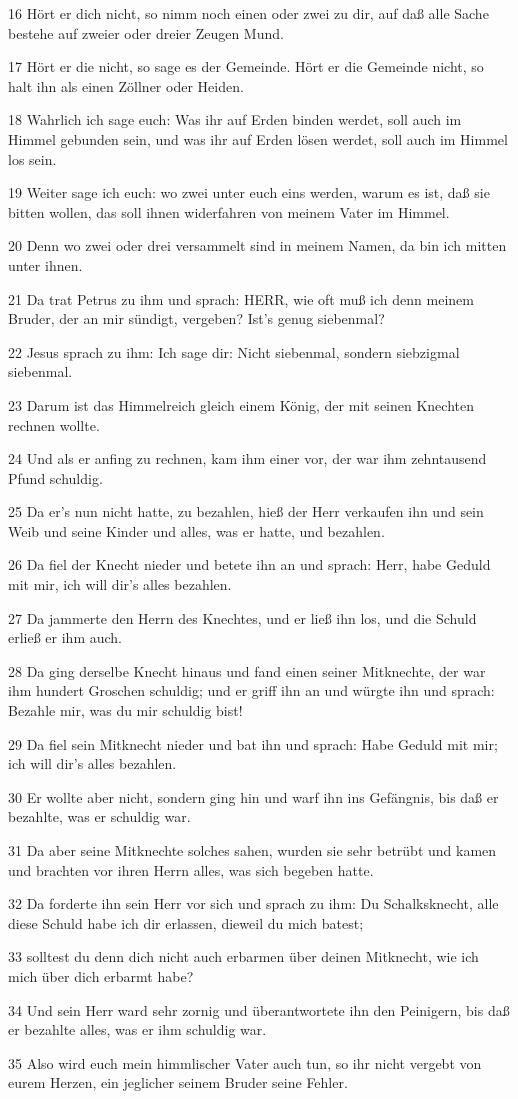 \par 16 Hört er dich nicht, so nimm noch einen oder zwei zu dir, auf daß alle Sache bestehe auf zweier oder dreier Zeugen Mund.
\par 17 Hört er die nicht, so sage es der Gemeinde. Hört er die Gemeinde nicht, so halt ihn als einen Zöllner oder Heiden.
\par 18 Wahrlich ich sage euch: Was ihr auf Erden binden werdet, soll auch im Himmel gebunden sein, und was ihr auf Erden lösen werdet, soll auch im Himmel los sein.
\par 19 Weiter sage ich euch: wo zwei unter euch eins werden, warum es ist, daß sie bitten wollen, das soll ihnen widerfahren von meinem Vater im Himmel.
\par 20 Denn wo zwei oder drei versammelt sind in meinem Namen, da bin ich mitten unter ihnen.
\par 21 Da trat Petrus zu ihm und sprach: HERR, wie oft muß ich denn meinem Bruder, der an mir sündigt, vergeben? Ist's genug siebenmal?
\par 22 Jesus sprach zu ihm: Ich sage dir: Nicht siebenmal, sondern siebzigmal siebenmal.
\par 23 Darum ist das Himmelreich gleich einem König, der mit seinen Knechten rechnen wollte.
\par 24 Und als er anfing zu rechnen, kam ihm einer vor, der war ihm zehntausend Pfund schuldig.
\par 25 Da er's nun nicht hatte, zu bezahlen, hieß der Herr verkaufen ihn und sein Weib und seine Kinder und alles, was er hatte, und bezahlen.
\par 26 Da fiel der Knecht nieder und betete ihn an und sprach: Herr, habe Geduld mit mir, ich will dir's alles bezahlen.
\par 27 Da jammerte den Herrn des Knechtes, und er ließ ihn los, und die Schuld erließ er ihm auch.
\par 28 Da ging derselbe Knecht hinaus und fand einen seiner Mitknechte, der war ihm hundert Groschen schuldig; und er griff ihn an und würgte ihn und sprach: Bezahle mir, was du mir schuldig bist!
\par 29 Da fiel sein Mitknecht nieder und bat ihn und sprach: Habe Geduld mit mir; ich will dir's alles bezahlen.
\par 30 Er wollte aber nicht, sondern ging hin und warf ihn ins Gefängnis, bis daß er bezahlte, was er schuldig war.
\par 31 Da aber seine Mitknechte solches sahen, wurden sie sehr betrübt und kamen und brachten vor ihren Herrn alles, was sich begeben hatte.
\par 32 Da forderte ihn sein Herr vor sich und sprach zu ihm: Du Schalksknecht, alle diese Schuld habe ich dir erlassen, dieweil du mich batest;
\par 33 solltest du denn dich nicht auch erbarmen über deinen Mitknecht, wie ich mich über dich erbarmt habe?
\par 34 Und sein Herr ward sehr zornig und überantwortete ihn den Peinigern, bis daß er bezahlte alles, was er ihm schuldig war.
\par 35 Also wird euch mein himmlischer Vater auch tun, so ihr nicht vergebt von eurem Herzen, ein jeglicher seinem Bruder seine Fehler.

